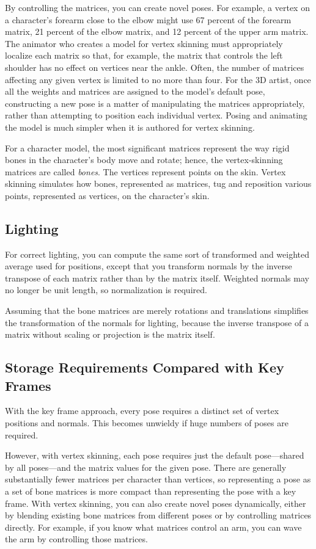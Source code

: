 \documentclass[../main.tex]{subfiles}
\begin{document}
By controlling the matrices, you can create novel poses. For example, a vertex on a character's forearm close to the elbow might use 67 percent of the forearm matrix, 21 percent of the elbow matrix, and 12 percent of the upper arm matrix. The animator who creates a model for vertex skinning must appropriately localize each matrix so that, for example, the matrix that controls the left shoulder has no effect on vertices near the ankle. Often, the number of matrices affecting any given vertex is limited to no more than four. For the 3D artist, once all the weights and matrices are assigned to the model's default pose, constructing a new pose is a matter of manipulating the matrices appropriately, rather than attempting to position each individual vertex. Posing and animating the model is much simpler when it is authored for vertex skinning.

For a character model, the most significant matrices represent the way rigid bones in the character's body move and rotate; hence, the vertex-skinning matrices are called \textit{bones}. The vertices represent points on the skin. Vertex skinning simulates how bones, represented as matrices, tug and reposition various points, represented as vertices, on the character's skin.

\subsection*{Lighting}

For correct lighting, you can compute the same sort of transformed and weighted average used for positions, except that you transform normals by the inverse transpose of each matrix rather than by the matrix itself. Weighted normals may no longer be unit length, so normalization is required.

Assuming that the bone matrices are merely rotations and translations simplifies the transformation of the normals for lighting, because the inverse transpose of a matrix without scaling or projection is the matrix itself.

\subsection*{Storage Requirements Compared with Key Frames}

With the key frame approach, every pose requires a distinct set of vertex positions and normals. This becomes unwieldy if huge numbers of poses are required.

However, with vertex skinning, each pose requires just the default pose—shared by all poses—and the matrix values for the given pose. There are generally substantially fewer matrices per character than vertices, so representing a pose as a set of bone matrices is more compact than representing the pose with a key frame. With vertex skinning, you can also create novel poses dynamically, either by blending existing bone matrices from different poses or by controlling matrices directly. For example, if you know what matrices control an arm, you can wave the arm by controlling those matrices.
\end{document}
